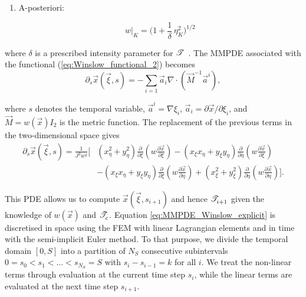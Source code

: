 \documentclass[a4paper,11pt]{article}
\begin{document}
{\begin{enumerate}
    \item A-posteriori:  
    
    \begin{equation}
        w|_{K} = \bigg( 1 +  \frac{1}{\delta} \, \eta^{2}_{K}\bigg)^{1/2}
    \label{eq:monitor_posteriori}
    \end{equation}

\end{enumerate}


where $\delta$ is a prescribed intensity parameter for $\mathscr T^{}$
\cite{HR:2011,BHR:2009}. The MMPDE associated with the functional (\ref{eq:Winslow_functional_2})
becomes
\begin{equation}
  \partial_s \vec{x} (\vec \xi ,s)
  =
  - \sum_{i=1} \vec{a}_{i} \nabla \cdot (\vec M^{-1}\vec{a}^{i}),
\label{eq:MMPDE_Winslow}
\end{equation}

where $s$ denotes the temporal variable, $\vec a^{i} = \nabla \xi_{i}$, $\vec a_{i} = \partial \vec{x}/\partial\xi_{i}$, and $\vec M = w(\vec{x})I_{2}$ is the metric function. The
replacement of the previous terms in the two-dimensional space gives
\begin{equation}
\begin{split}
  \partial_s \vec{x}(\vec{\xi},s)
  =
  \frac{1}{J^{2} w^{2}} \Bigg[& (x_{\eta}^{2} + y_{\eta}^{2})  \frac{\partial}{\partial \xi} \left(w \frac{\partial \vec{x}}{\partial \xi} \right) - (x_{\xi}x_{\eta} + y_{\xi}y_{\eta})\frac{\partial}{\partial \eta} \left( w \frac{\partial \vec{x}}{\partial \xi} \right)\\
      &-(x_{\xi}x_{\eta} + y_{\xi}y_{\eta})\frac{\partial}{\partial \xi} \left(w \frac{\partial \vec{x}}{\partial \eta} \right) + (x_{\xi}^{2} + y_{\xi}^{2})\frac{\partial}{\partial \eta}  \left( w\frac{\partial \vec{x}}{\partial \eta} \right) \Bigg].
\end{split}
\label{eq:MMPDE_Winslow_explicit}
\end{equation}

This PDE allows us to compute $\vec{x}(\vec{\xi},s_{i+1})$ and hence $\mathscr T^{}_{i+1}$ given the knowledge of $w(\vec{x})$ and $\mathscr T^{}_{c}$. Equation \eqref{eq:MMPDE_Winslow_explicit} is discretised in space using the FEM with linear Lagrangian elements and in time with the semi-implicit Euler method. To that purpose, we divide the temporal domain $[0,S]$ into a partition of $N_S$ consecutive subintervals $0=s_0 < s_1 < \dots < s_{N_S} = S$ with $s_i - s_{i-1} = k$ for all $i$. We treat the non-linear terms through evaluation at the current time step $s_i$, while the linear terms are evaluated at the next time step $s_{i+1}$.

}
\end{document}
